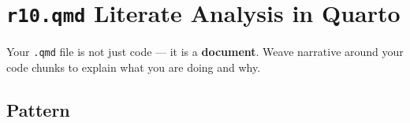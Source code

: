 \documentclass[
  letterpaper,
  DIV=11,
  numbers=noendperiod,
  oneside]{scrreprt}
\begin{document}
\section*{\texorpdfstring{\texttt{r10.qmd} Literate Analysis in
Quarto}{r10.qmd Literate Analysis in Quarto}}\label{r10.qmd-literate-analysis-in-quarto}


Your \texttt{.qmd} file is not just code --- it is a \textbf{document}.
Weave narrative around your code chunks to explain what you are doing
and why.

\subsection*{Pattern}\label{pattern}
\end{document}
